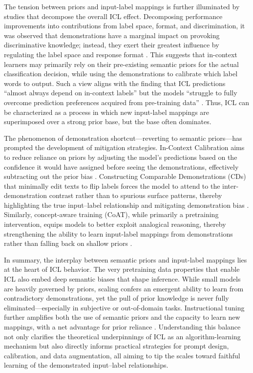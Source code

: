 \documentclass[11pt]{article}
\begin{document}
The tension between priors and input-label mappings is further illuminated by studies that decompose the overall ICL effect. Decomposing performance improvements into contributions from label space, format, and discrimination, it was observed that demonstrations have a marginal impact on provoking discriminative knowledge; instead, they exert their greatest influence by regulating the label space and response format \cite{ref45}. This suggests that in-context learners may primarily rely on their pre-existing semantic priors for the actual classification decision, while using the demonstrations to calibrate which label words to output. Such a view aligns with the finding that ICL predictions ``almost always depend on in-context labels'' but the models ``struggle to fully overcome prediction preferences acquired from pre-training data'' \cite{ref41}. Thus, ICL can be characterized as a process in which new input-label mappings are superimposed over a strong prior base, but the base often dominates.

The phenomenon of demonstration shortcut---reverting to semantic priors---has prompted the development of mitigation strategies. In-Context Calibration aims to reduce reliance on priors by adjusting the model's predictions based on the confidence it would have assigned before seeing the demonstrations, effectively subtracting out the prior bias \cite{ref39}. Constructing Comparable Demonstrations (CDs) that minimally edit texts to flip labels forces the model to attend to the inter-demonstration contrast rather than to spurious surface patterns, thereby highlighting the true input--label relationship and mitigating demonstration bias \cite{ref46}. Similarly, concept-aware training (CoAT), while primarily a pretraining intervention, equips models to better exploit analogical reasoning, thereby strengthening the ability to learn input-label mappings from demonstrations rather than falling back on shallow priors \cite{ref38}.

In summary, the interplay between semantic priors and input-label mappings lies at the heart of ICL behavior. The very pretraining data properties that enable ICL also embed deep semantic biases that shape inference. While small models are heavily governed by priors, scaling confers an emergent ability to learn from contradictory demonstrations, yet the pull of prior knowledge is never fully eliminated---especially in subjective or out-of-domain tasks. Instructional tuning further amplifies both the use of semantic priors and the capacity to learn new mappings, with a net advantage for prior reliance \cite{ref40}. Understanding this balance not only clarifies the theoretical underpinnings of ICL as an algorithm-learning mechanism but also directly informs practical strategies for prompt design, calibration, and data augmentation, all aiming to tip the scales toward faithful learning of the demonstrated input--label relationships.
\end{document}
